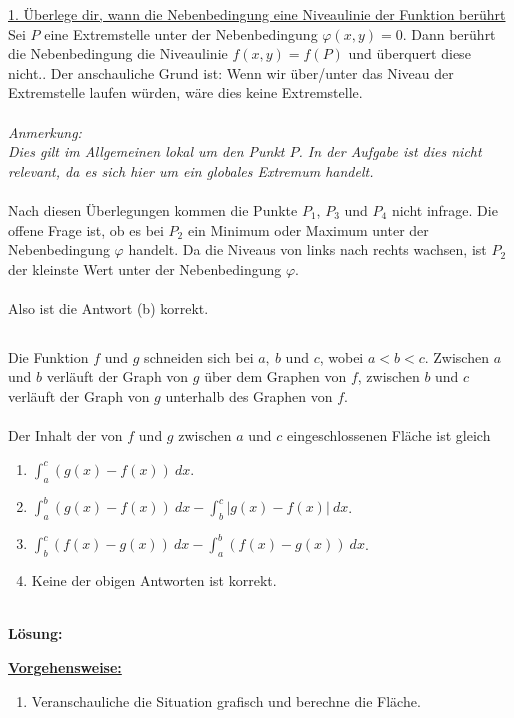\underline{1. Überlege dir, wann die Nebenbedingung eine Niveaulinie der Funktion berührt}\\
Sei $ P $ eine Extremstelle unter der Nebenbedingung $ \varphi(x,y) = 0 $.
Dann berührt die Nebenbedingung die Niveaulinie $ f(x,y) = f(P) $ und überquert diese nicht..
Der anschauliche Grund ist: Wenn wir über/unter das Niveau der Extremstelle laufen würden, wäre dies keine Extremstelle.\\
\\
\textit{Anmerkung:\\
Dies gilt im Allgemeinen lokal um den Punkt $ P $.
In der Aufgabe ist dies nicht relevant, da es sich hier um ein globales Extremum handelt.\\
}\\
Nach diesen Überlegungen kommen die Punkte $ P_1 $, $ P_3 $ und $ P_4 $ nicht infrage.
Die offene Frage ist, ob es bei $ P_2 $ ein Minimum oder Maximum unter der Nebenbedingung $ \varphi $ handelt.
Da die Niveaus von links nach rechts wachsen, ist $ P_2 $ der kleinste Wert unter der Nebenbedingung $ \varphi $.\\
\\
Also ist die Antwort (b) korrekt.
\newpage

\subsection*{}
Die Funktion $ f $ und $ g $ schneiden sich bei $ a,\ b $ und $ c $, wobei $ a < b < c $. Zwischen $ a $ und $ b $ verläuft der Graph von $ g $ über dem Graphen von $ f $, zwischen $ b   $ und $ c $ verläuft der Graph von $ g $ unterhalb des Graphen von $ f $.\\
\\
Der Inhalt der von $ f $ und $ g $ zwischen $ a $ und $ c $ eingeschlossenen Fläche ist gleich  
\renewcommand{\labelenumi}{(\alph{enumi})}
\begin{enumerate}
	\item 
	$ \int_a^c (g(x) - f(x)) \ dx $.
	\item
	$ \int_a^b (g(x) - f(x)) \ dx - \int_b^c |g(x) - f(x)| \ dx$.
	\item
	$ \int_b^c (f(x) - g(x)) \ dx - \int_a^b (f(x) - g(x)) \ dx$.
	\item
	Keine der obigen Antworten ist korrekt.
\end{enumerate}
\ \\
\textbf{Lösung:}
\begin{mdframed}
\underline{\textbf{Vorgehensweise:}}
\renewcommand{\labelenumi}{\theenumi.}
\begin{enumerate}
\item Veranschauliche die Situation grafisch und berechne die Fläche.
\end{enumerate}
\end{mdframed}

